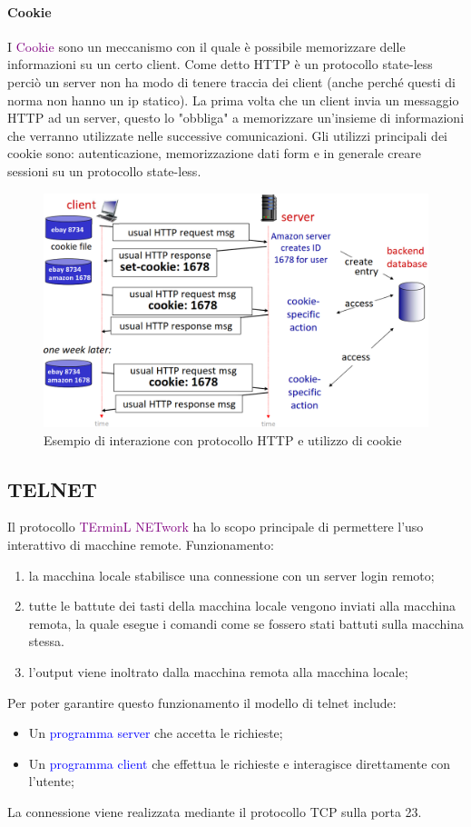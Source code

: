 \paragraph{Cookie} I \textcolor{purple}{Cookie} sono un meccanismo con il quale è possibile memorizzare delle informazioni su un certo client.
Come detto HTTP è un protocollo state-less perciò un server non ha modo di tenere traccia dei client (anche perché questi di norma non hanno un ip statico).
La prima volta che un client invia un messaggio HTTP ad un server, questo lo "obbliga" a memorizzare un'insieme di informazioni che verranno utilizzate nelle successive comunicazioni.
\newline Gli utilizzi principali dei cookie sono: autenticazione, memorizzazione dati form e in generale creare sessioni su un protocollo state-less.

\begin{figure}[h]
    \centering
    \includegraphics[scale=0.25]{Immagini/Cookie.png}
    \caption{Esempio di interazione con protocollo HTTP e utilizzo di cookie}
\end{figure}
\newpage
\subsection{TELNET} Il protocollo \textcolor{purple}{TErminL NETwork} ha lo scopo principale di permettere l'uso interattivo di macchine remote. Funzionamento:
\begin{enumerate}
    \item la macchina locale stabilisce una connessione con un server login remoto;
    \item tutte le battute dei tasti della macchina locale vengono inviati alla macchina remota, la quale esegue i comandi come se fossero stati battuti sulla macchina stessa.
    \item l'output viene inoltrato dalla macchina remota alla macchina locale;
\end{enumerate}
Per poter garantire questo funzionamento il modello di telnet include:
\begin{itemize}
    \item Un \textcolor{blue}{programma server} che accetta le richieste;
    \item Un \textcolor{blue}{programma client} che effettua le richieste e interagisce direttamente con l'utente;
\end{itemize}
La connessione viene realizzata mediante il protocollo TCP sulla porta 23.

